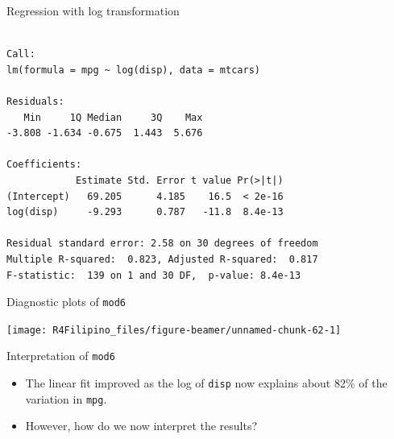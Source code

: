 \begin{frame}[fragile]{Regression with log transformation}

\begin{Shaded}
\begin{Highlighting}[]
\StringTok{ }\OperatorTok{~}
\end{Highlighting}
\end{Shaded}

\begin{verbatim}

Call:
lm(formula = mpg ~ log(disp), data = mtcars)

Residuals:
   Min     1Q Median     3Q    Max 
-3.808 -1.634 -0.675  1.443  5.676 

Coefficients:
            Estimate Std. Error t value Pr(>|t|)
(Intercept)   69.205      4.185    16.5  < 2e-16
log(disp)     -9.293      0.787   -11.8  8.4e-13

Residual standard error: 2.58 on 30 degrees of freedom
Multiple R-squared:  0.823, Adjusted R-squared:  0.817 
F-statistic:  139 on 1 and 30 DF,  p-value: 8.4e-13
\end{verbatim}

\end{frame}

\begin{frame}[fragile]{Diagnostic plots of \texttt{mod6}}

\begin{Shaded}
\begin{Highlighting}[]
\NormalTok{(}\NormalTok{(}\NormalTok{,}\NormalTok{))}
\end{Highlighting}
\end{Shaded}

\begin{center}\texttt{[image: R4Filipino\_files/figure-beamer/unnamed-chunk-62-1]} \end{center}

\end{frame}

\begin{frame}[fragile]{Interpretation of \texttt{mod6}}

\begin{itemize}
\tightlist
\item
  The linear fit improved as the log of \texttt{disp} now explains about
  82\% of the variation in \texttt{mpg}.
\item
  However, how do we now interpret the results?
\end{itemize}

\end{frame}

